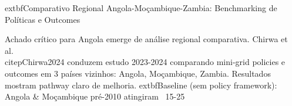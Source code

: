 \documentclass[12pt, a4paper]{article}
\begin{document}
	extbf{Comparativo Regional Angola-Moçambique-Zambia: Benchmarking de Políticas e Outcomes}

Achado crítico para Angola emerge de análise regional comparativa. Chirwa et al.~\\citep{Chirwa2024} conduzem estudo 2023-2024 comparando mini-grid policies e outcomes em 3 países vizinhos: Angola, Moçambique, Zambia. Resultados mostram pathway claro de melhoria. 	extbf{Baseline (sem policy framework)}: Angola & Moçambique pré-2010 atingiram ~15-25\\%
\end{document}
